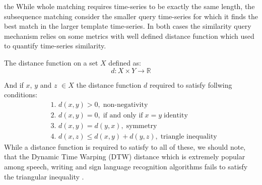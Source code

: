 the While whole matching requires time-series to be exactly the same length, the subsequence matching consider the smaller query time-series for which it finds the best match in the larger template time-series. In both cases the similarity query mechanism relies on some metrics with well defined distance function which used to quantify time-series similarity. 

The distance function on a set $X$ defined as:
\begin{equation}
 d: X \times Y \rightarrow \mathbb{R}
\end{equation}

And if $x$, $y$ and $z$ $\in X$ the distance function $d$ required to satisfy follwing conditions:
\begin{align}
 & \mbox{1. } d(x, y) > 0, \; \mbox{non-negativity} \\
 & \mbox{2. } d(x, y) = 0, \; \mbox{if and only if} \; x = y  \;  \mbox{identity} \\
 & \mbox{3. } d(x, y) = d(y, x), \; \mbox{symmetry} \\
 & \mbox{4. } d(x, z) \leq d(x, y) + d(y, z), \; \mbox{triangle inequality}
\end{align}
While a distance function is required to satisfy to all of these, we should note, that the Dynamic Time Warping (DTW) distance which is extremely popular among speech, writing and sign language recognition algorithms \cite{citeulike:3496861} \cite{citeulike:3744226} \cite{citeulike:3733947} \cite{citeulike:3789964} fails to satisfy the triangular inequality \cite{citeulike:4343286} \cite{citeulike:4343933}.